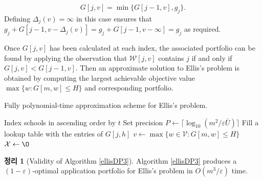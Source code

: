 \documentclass[11pt]{article} %
\newtheorem{theorem}{Theorem}
\theoremstyle{definition}
\newtheorem{theorem}{정리}
\theoremstyle{definition}
\begin{document}
\begin{equation}G[j, v] = \min\bigl\{G[j-1, v], g_j \bigr\}.\end{equation}
Defining $\Delta_j(v) = \infty$ in this case ensures that $g_j + G[j-1, v-\Delta_j(v)] = g_j+ G[j-1, v-\infty] = g_j $ as required.
%

Once $G[j, v]$ has been calculated at each index, the associated portfolio can be found by applying the observation that $\mathcal{W}[j, v]$ contains $j$ if and only if $G[j, v] < G[j-1, v]$. Then an approximate solution to Ellis's problem is obtained by computing the largest achievable objective value $\max\{ w: G[m, w] \leq H\}$ and corresponding portfolio.

\begin{algorithm}[h] 
\caption{Fully polynomial-time approximation scheme for Ellis's problem.} \label{ellisDP3}
\KwData{Utility values $t \in \mathbb{N}^m$, admissions probabilities $f \in (0, 1]^m$, application costs $g \in (0, \infty)^m$, budget $H \in (0, \infty)^m$, tolerance $\varepsilon \in (0, 1)$.}
Index schools in ascending order by $t$\;
Set precision $P \gets \bigl\lceil\log_{10}\left(m^2 / \varepsilon \bar U\right)\bigr\rceil$\;
Fill a lookup table with the entries of $G[j, h]$\; \label{createdlookuptable}
$v\gets  \max\{ w \in \mathcal{V} : G[m, w] \leq H\}$\; \label{vrecordedhere}
$\mathcal{X} \gets \O$\;
\end{algorithm}

\begin{theorem}[Validity of Algorithm \ref{ellisDP3}]
Algorithm \ref{ellisDP3} produces a $(1 - \varepsilon)$-optimal application portfolio for Ellis's problem in $O(m^3 /\varepsilon)$ time. %
\end{theorem}
\end{document}
